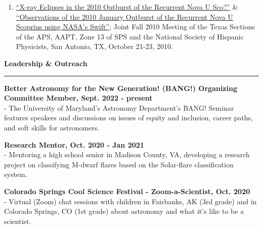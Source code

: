 \documentclass[letter,11pt]{article}
\begin{document}
\begin{enumerate}[\bfseries 1.]


\item \href{http://adsabs.harvard.edu/abs/2010APS..TSFFP1019V}{“X-ray Eclipses in the 2010 Outburst of the Recurrent Nova U Sco?”} \&  \href{http://adsabs.harvard.edu/abs/2010APS..TSFFP1013M}{“Observations of the 2010 January Outburst of the Recurrent Nova U Scoprius using NASA's Swift”}; Joint Fall 2010 Meeting of the Texas Sections of the APS, AAPT, Zone 13 of SPS and the National Society of Hispanic Physicists, San Antonio, TX, October 21-23, 2010.

\end{enumerate}


\noindent
{\bf Leadership \& Outreach} \\
\vspace{-9mm}
\begin{center}
\rule{\textwidth}{0.2mm}
\end{center}
\vspace{-3mm}

\noindent
\textbf{Better Astronomy for the New Generation! (BANG!) Organizing Committee Member, Sept. 2022 - present} \\
- The University of Maryland's Astronomy Department's BANG! Seminar features speakers and discussions on issues of equity and inclusion, career paths, and soft skills for astronomers.
\vskip 0.2in

\noindent
\textbf{Research Mentor, Oct. 2020 - Jan 2021} \\
- Mentoring a high school senior in Madison County, VA, developing a research project on classifying M-dwarf flares based on the Solar-flare classification system.
\vskip 0.2in

\noindent
\textbf{Colorado Springs Cool Science Festival - Zoom-a-Scientist, Oct. 2020} \\
- Virtual (Zoom) chat sessions with children in Fairbanks, AK (3rd grade) and in Colorado Springs, CO (1st grade) about astronomy and what it's like to be a scientist.
\vskip 0.2in
\end{document}
